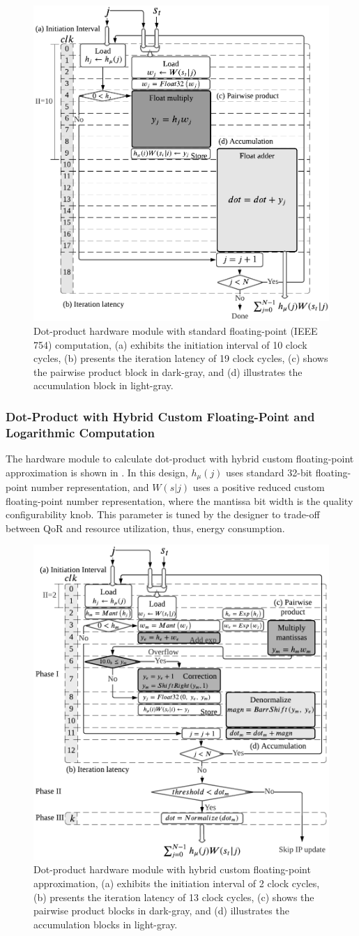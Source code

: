 \begin{figure}[b!]
	\centering
	\includegraphics[width=0.5\columnwidth]{./chapters/sbs_accelerator/figures/dot_product_float.pdf}
	\caption{Dot-product hardware module with standard floating-point (IEEE 754) computation, (a) exhibits the initiation interval of 10 clock cycles, (b) presents the iteration latency of 19 clock cycles, (c) shows the pairwise product block in dark-gray, and (d) illustrates the accumulation block in light-gray.}
	\label{fig:dot_product_float}
\end{figure}

\subsubsection{Dot-Product with Hybrid Custom Floating-Point and Logarithmic Computation}
 The hardware module to calculate dot-product with hybrid custom floating-point approximation is shown in . In this design, $h_\mu(j)$ uses standard 32-bit floating-point number representation, and $W(s|j)$ uses a positive reduced custom floating-point number representation, where the mantissa bit width is the quality configurability knob. This parameter is tuned by the designer to trade-off between QoR and resource utilization, thus, energy consumption.
 
 \begin{figure}
 	\centering
 	\includegraphics[width=0.5\columnwidth]{./chapters/sbs_accelerator/figures/dot_product.pdf}
 	\caption{Dot-product hardware module with hybrid custom floating-point approximation, (a) exhibits the initiation interval of 2 clock cycles, (b) presents the iteration latency of 13 clock cycles, (c) shows the pairwise product blocks in dark-gray, and (d) illustrates the accumulation blocks in light-gray.}
 	\label{fig:dot_product_custom}
 \end{figure}
 
